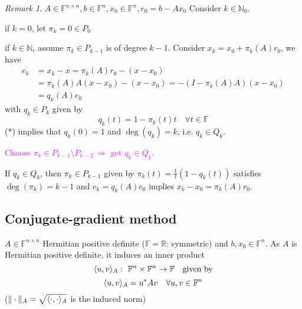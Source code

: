 \documentclass[12pt]{article}
\theoremstyle{definition}
\theoremstyle{remark}
\newtheorem{remark}[theorem]{Remark}
\numberwithin{equation}{section}
\newcommand{\F}{\mathbb{F}}
\newcommand{\R}{\mathbb{R}}
\newcommand{\N}{\mathbb{N}}
\newcommand{\normempty}{\|\cdot\|}
\DeclarePairedDelimiter{\iprod}{\langle}{\rangle}
\begin{document}
\begin{remark}
  \label{rem:7.3}
  $A \in \F^{n\times n}, b \in \F^n, x_0 \in \F^n, r_0 = b - Ax_0$ Consider $k \in \N_0$.

  if $k=0$, let $\pi_k = 0 \in P_0$

  if $k \in \N$, assume $\pi_k \in P_{k-1}$ is of degree $k-1$. Consider $x_k = x_0 + \pi_k(A) r_0$, we have
  \begin{align*}
    e_k &= x_k - x = \pi_k(A) r_0 - (x - x_0) \\
    &= \pi_k(A) A (x - x_0) - (x-x_0) = -(I-\pi_k(A) A)(x-x_0) \\
    &= q_k(A) e_0
  \end{align*}
  with $q_k \in P_k$ given by
  \begin{equation*}
    \tag{*}
    \boxed{q_k(t) = 1 - \pi_k(t)t} \quad \forall t \in \F
  \end{equation*}
  (*) implies that $q_k(0) = 1$ and $\deg(q_k) = k$, i.e. $q_k \in Q_k$.

  \textcolor{magenta}{
    Choose $\pi_k \in P_{k-1} \setminus P_{k-2}\ \Longrightarrow$ get $q_k \in Q_k$.
  }

  If $q_k \in Q_k$, then $\pi_k \in P_{k-1}$ given by $\pi_k(t) = \frac{1}{t}(1-q_k(t))$ satisfies $\deg(\pi_k) = k-1$ and $e_k = q_k(A)e_0$ implies $x_k - x_0 = \pi_k(A) r_0$.
\end{remark}
\subsection*{Conjugate-gradient method}
$A \in \F^{n\times n}$ Hermitian positive definite ($\F = \R$: symmetric) and $b, x_0 \in \F^n$. As $A$ is Hermitian positive definite, it induces an inner product
\begin{equation*}
  \iprod{u,v}_A:\ \F^n \times \F^n \rightarrow \F \quad \text{given by}
\end{equation*}
\begin{equation*}
  \iprod{u,v}_A = u^* A v \quad \forall u, v \in \F^n
\end{equation*}
($\normempty_A= \sqrt{\iprod{\cdot,\cdot}_A}$ is the induced norm)
\end{document}
